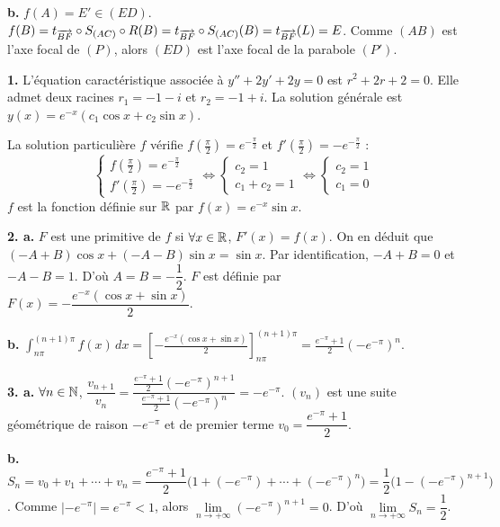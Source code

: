 \documentclass[11pt]{article}
\begin{document}
\textbf{b.} $f(A) = E' \in (ED)$. $f(B) = t_{\overrightarrow{BF}} \circ S_{(AC)} \circ R(B) = t_{\overrightarrow{BF}} \circ S_{(AC)}(B) = t_{\overrightarrow{BF}}(L) = E$. Comme $(AB)$ est l'axe focal de $(P)$, alors $(ED)$ est l'axe focal de la parabole $(P')$.


\textbf{1.} L'équation caractéristique associée à $y'' + 2y' + 2y = 0$ est $r^2 + 2r + 2 = 0$. Elle admet deux racines $r_1 = -1 - i$ et $r_2 = -1 + i$. La solution générale est $y(x) = e^{-x}(c_1\cos x + c_2\sin x)$.

La solution particulière $f$ vérifie $f\!\left(\tfrac{\pi}{2}\right) = e^{-\frac{\pi}{2}}$ et $f'\!\left(\tfrac{\pi}{2}\right) = -e^{-\frac{\pi}{2}}$ :
\[ \begin{cases} f\!\left(\tfrac{\pi}{2}\right) = e^{-\frac{\pi}{2}} \\ f'\!\left(\tfrac{\pi}{2}\right) = -e^{-\frac{\pi}{2}} \end{cases} \Longleftrightarrow \begin{cases} c_2 = 1 \\ c_1 + c_2 = 1 \end{cases} \Longleftrightarrow \begin{cases} c_2 = 1 \\ c_1 = 0 \end{cases} \]
$f$ est la fonction définie sur $\mathbb{R}$ par $f(x) = e^{-x}\sin x$.

\textbf{2. a.} $F$ est une primitive de $f$ si $\forall x \in \mathbb{R}$, $F'(x) = f(x)$. On en déduit que $(-A + B)\cos x + (-A - B)\sin x = \sin x$. Par identification, $-A + B = 0$ et $-A - B = 1$. D'où $A = B = -\dfrac{1}{2}$. $F$ est définie par $F(x) = -\dfrac{e^{-x}(\cos x + \sin x)}{2}$.

\textbf{b.} $\displaystyle\int_{n\pi}^{(n+1)\pi} f(x)\,dx = \left[-\frac{e^{-x}(\cos x + \sin x)}{2}\right]_{n\pi}^{(n+1)\pi} = \frac{e^{-\pi} + 1}{2}(-e^{-\pi})^n$.

\textbf{3. a.} $\forall n \in \mathbb{N}$, $\dfrac{v_{n+1}}{v_n} = \dfrac{\frac{e^{-\pi} + 1}{2}(-e^{-\pi})^{n+1}}{\frac{e^{-\pi} + 1}{2}(-e^{-\pi})^n} = -e^{-\pi}$. $(v_n)$ est une suite géométrique de raison $-e^{-\pi}$ et de premier terme $v_0 = \dfrac{e^{-\pi} + 1}{2}$.

\textbf{b.} $S_n = v_0 + v_1 + \cdots + v_n = \dfrac{e^{-\pi} + 1}{2}\big(1 + (-e^{-\pi}) + \cdots + (-e^{-\pi})^n\big) = \dfrac{1}{2}\big(1 - (-e^{-\pi})^{n+1}\big)$. Comme $|-e^{-\pi}| = e^{-\pi} < 1$, alors $\lim\limits_{n\to+\infty}(-e^{-\pi})^{n+1} = 0$. D'où $\lim\limits_{n\to+\infty} S_n = \dfrac{1}{2}$.
\end{document}
